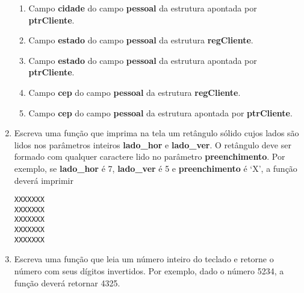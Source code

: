 \documentclass[a4paper,11pt]{article}
\begin{document}
\begin{multicols*}{2}
\begin{enumerate}
\begin{enumerate}
      \item Campo \textbf{cidade} do campo \textbf{pessoal} da estrutura apontada por \textbf{ptrCliente}.
      \item Campo \textbf{estado} do campo \textbf{pessoal} da estrutura \textbf{regCliente}.
      \item Campo \textbf{estado} do campo \textbf{pessoal} da estrutura apontada por \textbf{ptrCliente}.
      \item Campo \textbf{cep} do campo \textbf{pessoal} da estrutura \textbf{regCliente}.
      \item Campo \textbf{cep} do campo \textbf{pessoal} da estrutura apontada por \textbf{ptrCliente}.
    \end{enumerate}

  \item  Escreva uma função que imprima na tela um retângulo sólido cujos lados são lidos nos parâmetros inteiros \textbf{lado\_hor} e \textbf{lado\_ver}. O retângulo deve ser formado com qualquer caractere lido no parâmetro \textbf{preenchimento}. Por exemplo, se \textbf{lado\_hor} é 7, \textbf{lado\_ver} é 5 e \textbf{preenchimento} é `X', a função deverá imprimir

    \begin{verbatim}
XXXXXXX
XXXXXXX
XXXXXXX
XXXXXXX
XXXXXXX
    \end{verbatim}

  \item Escreva uma função que leia um número inteiro do teclado e retorne o número com seus dígitos invertidos. Por exemplo, dado o número 5234, a função deverá retornar 4325.
\end{enumerate}
\end{multicols*}
\end{document}

